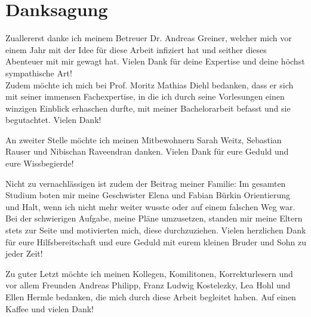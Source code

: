 \chapter{Danksagung}

Zuallererst danke ich meinem Betreuer Dr. Andreas Greiner, welcher mich vor einem Jahr mit der Idee für diese Arbeit infiziert hat und seither dieses Abenteuer mit mir gewagt hat.
Vielen Dank für deine Expertise und deine höchst sympathische Art!\\
Zudem möchte ich mich bei Prof. Moritz Mathias Diehl bedanken, dass er sich mit seiner immensen Fachexpertise, in die ich durch seine Vorlesungen einen winzigen Einblick erhaschen durfte, mit meiner Bachelorarbeit befasst und sie begutachtet. Vielen Dank!

An zweiter Stelle möchte ich meinen Mitbewohnern Sarah Weitz, Sebastian Rauser und Nibischan Raveendran danken.
Vielen Dank für eure Geduld
und eure Wissbegierde!

Nicht zu vernachlässigen ist zudem der Beitrag meiner Familie: Im gesamten Studium boten mir meine Geschwister Elena und Fabian Bürkin Orientierung und Halt, wenn ich nicht mehr weiter wusste oder auf einem falschen Weg war.
Bei der schwierigen Aufgabe, meine Pläne umzusetzen, standen mir meine Eltern stets zur Seite und motivierten mich, diese durchzuziehen. Vielen herzlichen Dank für eure Hilfsbereitschaft und eure Geduld mit eurem kleinen Bruder und Sohn zu jeder Zeit!

Zu guter Letzt möchte ich meinen Kollegen, Komilitonen, Korrekturlesern und vor allem Freunden Andreas Philipp, Franz Ludwig Kostelezky, Lea Hohl und Ellen Hermle bedanken, die mich durch diese Arbeit begleitet haben. Auf einen Kaffee und vielen Dank!